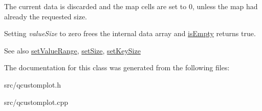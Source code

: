 The current data is discarded and the map cells are set to 0, unless the map had already the requested size.

Setting {\itshape value\+Size} to zero frees the internal data array and \hyperlink{classQCPColorMapData_a986009324aee1fc5f696db46bd03dde5}{is\+Empty} returns true.

\begin{DoxySeeAlso}{See also}
\hyperlink{classQCPColorMapData_ada1b2680ba96a5f4175b6d341cf75d23}{set\+Value\+Range}, \hyperlink{classQCPColorMapData_a0d9ff35c299d0478b682bfbcdd9c097e}{set\+Size}, \hyperlink{classQCPColorMapData_ac7ef70e383aface34b44dbde49234b6b}{set\+Key\+Size} 
\end{DoxySeeAlso}


The documentation for this class was generated from the following files\+:\begin{DoxyCompactItemize}
\item 
src/qcustomplot.\+h\item 
src/qcustomplot.\+cpp\end{DoxyCompactItemize}
